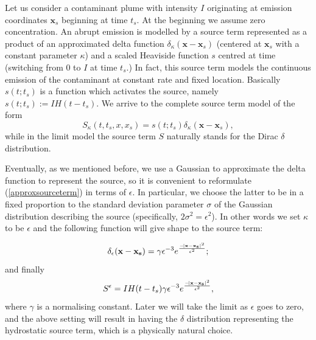 \documentclass[11pt]{article}
\begin{document}
Let us consider a contaminant plume with intensity $I$ originating at emission coordinates $\mathbf{x}_s$ beginning at time $t_s$. At the beginning we assume zero concentration.
An abrupt emission is modelled by a source term represented as a product of an approximated delta function $\delta_\kappa (\mathbf{x} - \mathbf{x}_s)$ (centered at $\mathbf{x}_s$ with a constant parameter $\kappa$) and a scaled Heaviside function $s$ centred at time (switching from 0 to $I$ at time $t_s.$)
In fact, this source term models the continuous emission of the contaminant at constant rate and fixed location.
Basically $s(t;t_s)$ is a function which activates the source, namely $s(t;t_s) := IH(t - t_s).$ We arrive to the complete source term model of the form
%
\begin{equation} \label{approxsourceterm}
S_\kappa (t, t_s, x, x_s) = s(t; t_s) \delta_\kappa (\mathbf{x} - \mathbf{x}_s),
\end{equation}
%
while in the limit model the source term $S$ naturally stands for the Dirac $\delta$ distribution.

Eventually, as we mentioned before, we use a Gaussian to approximate the delta function to represent the source, so it is convenient to reformulate (\ref{approxsourceterm}) in terms of $\epsilon.$ In particular, we choose the latter to be in a fixed proportion to the standard deviation parameter $\sigma$ of the Gaussian distribution describing the source (specifically, $2\sigma^2 = \epsilon^2$). In other words we set $\kappa$ to be $\epsilon$ and the following function will give shape to the source term:

\[\delta_\epsilon (\mathbf{x}-\mathbf{x_s}) = \gamma \epsilon^{-3} e ^ {\frac{-\abs{\mathbf{x}-\mathbf{x_s}}^2}{\epsilon^2}};\]
%
and finally
%
\begin{equation} \label{sourcedefinition}
S^\epsilon = I H(t-t_s) \gamma \epsilon^{-3} e ^ {\frac{-\abs{\mathbf{x}-\mathbf{x_s}}^2}{\epsilon^2}},
\end{equation}
%
where $\gamma$ is a normalising constant. Later we will take the limit as $\epsilon$ goes to zero, and the above setting will result in having the $\delta$ distribution representing the hydrostatic source term, which is a physically natural choice.
\end{document}
